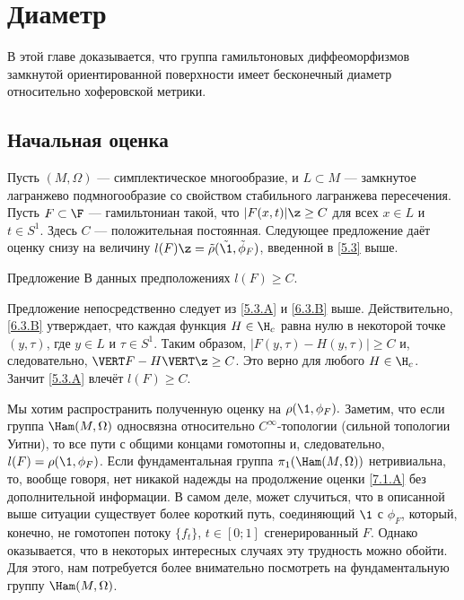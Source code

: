 \chapter{Диаметр}

В этой главе доказывается, что группа гамильтоновых диффеоморфизмов замкнутой ориентированной поверхности имеет бесконечный диаметр относительно хоферовской метрики.

\section{Начальная оценка}
Пусть $(M, \Omega)$ --- симплектическое многообразие, и $L \subset M$ --- замкнутое лагранжево подмногообразие со свойством стабильного лагранжева пересечения.
Пусть $F \subset \F$ --- гамильтониан такой, что $| F (x, t) | \z\ge C$ для всех $x \in L$ и $t \in S^1$.
Здесь $C$ --- положительная постоянная.
Следующее предложение даёт оценку снизу на величину $l (F) \z= \tilde\rho (\tilde\1, \tilde\phi_F)$, введенной в \ref{5.3} выше.

\begin{thm}{Предложение}\label{7.1.A}
В данных предположениях $l (F) \ge C$.
\end{thm}

Предложение непосредственно следует из \ref{5.3.A} и \ref{6.3.B} выше.
Действительно, \ref{6.3.B} утверждает, что каждая функция $H \in \H_c$ равна нулю в некоторой точке $(y, \tau)$, где $y \in L$ и $\tau \in S^1$.
Таким образом, $| F (y, \tau) - H (y, \tau) | \ge C$ и, следовательно, $\VERT F - H \VERT \z\ge C$.
Это верно для любого $H \in \H_c$.
Занчит \ref{5.3.A} влечёт $l (F) \ge C$.
\qeds

Мы хотим распространить полученную оценку на $\rho (\1, \phi_F).$
Заметим, что если группа $\Ham (M, \Omega)$ односвязна относительно $C^\infty$-топологии (сильной топологии Уитни), то все пути с общими концами гомотопны и, следовательно, $l (F) = \rho (\1, \phi_F)$.
Если фундаментальная группа $\pi_1 (\Ham (M, \Omega))$ нетривиальна, то, вообще говоря, нет никакой надежды на продолжение оценки \ref{7.1.A} без дополнительной информации.
В самом деле, может случиться, что в описанной выше ситуации существует более короткий путь, соединяющий $\1$ с $\phi_F$, который, конечно, не гомотопен потоку $\{f_t\}$, $t \in [0; 1]$ сгенерированный $F$.
Однако оказывается, что в некоторых интересных случаях эту трудность можно обойти.
Для этого, нам потребуется более внимательно посмотреть на фундаментальную группу $\Ham (M, \Omega)$.

